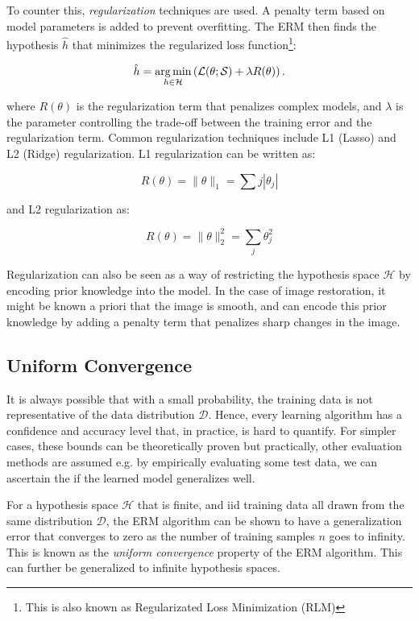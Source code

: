 To counter this, \textit{regularization} techniques are used. A penalty term based on model parameters is added to prevent overfitting. The \gls{ERM} then finds the hypothesis $\hat{h}$ that minimizes the regularized loss function\footnote{This is also known as Regularizated Loss Minimization (RLM)}:

\begin{equation}
    \hat{h} = \operatorname*{arg\,min}_{h \in \mathcal{H}} \left(\mathcal{L}(\theta; \mathcal{S})  + \lambda R(\theta) \right).
\end{equation}

where $R(\theta)$ is the regularization term that penalizes complex models, and $\lambda$ is the parameter controlling the trade-off between the training error and the regularization term. Common regularization techniques include L1 (Lasso) and L2 (Ridge) regularization. L1 regularization can be written as:

\begin{equation*}
    R(\theta) = \|\theta\|_1 = \sum{j} |\theta_j|
\end{equation*}

and L2 regularization as:

\begin{equation*}
    R(\theta) = \|\theta\|^2_2 = \sum_{j} \theta_j^2
\end{equation*}

Regularization can also be seen as a way of restricting the hypothesis space $\mathcal{H}$ by encoding prior knowledge into the model. In the case of image restoration, it might be known a priori that the image is smooth, and  can encode this prior knowledge by adding a penalty term that penalizes sharp changes in the image.


\subsection{Uniform Convergence}
It is always possible that with a small probability, the training data is not representative of the data distribution $\mathcal{D}$. Hence, every learning algorithm has a confidence and accuracy level that, in practice, is hard to quantify. For simpler cases, these bounds can be theoretically proven but practically, other evaluation methods are assumed e.g. by empirically evaluating some test data, we can ascertain the if the learned model generalizes well.

For a hypothesis space $\mathcal{H}$ that is finite, and \gls{iid} training data all drawn from the same distribution $\mathcal{D}$, the \gls{ERM} algorithm can be shown to have a generalization error that converges to zero as the number of training samples $n$ goes to infinity. This is known as the \textit{uniform convergence} property of the \gls{ERM} algorithm. This can further be generalized to infinite hypothesis spaces.


